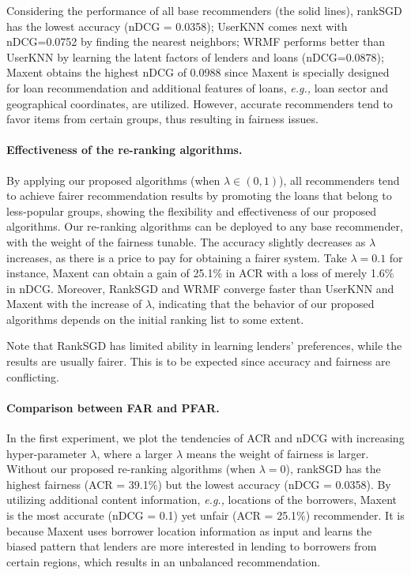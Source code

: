 Considering the performance of all base recommenders (the solid lines), rankSGD has the lowest accuracy (nDCG = 0.0358); UserKNN comes next with nDCG=0.0752 by finding the nearest neighbors; WRMF performs better than UserKNN by learning the latent factors of lenders and loans (nDCG=0.0878); Maxent obtains the highest nDCG of 0.0988 since Maxent is specially designed for loan recommendation and additional features of loans, \emph{e.g.,} loan sector and geographical coordinates, are utilized. However, accurate recommenders tend to favor items from certain groups, thus resulting in fairness issues.

\paragraph{Effectiveness of the re-ranking algorithms.} By applying our proposed algorithms (when $\lambda\in(0,1)$), all recommenders tend to achieve fairer recommendation results by promoting the loans that belong to less-popular groups, showing the flexibility and effectiveness of our proposed algorithms. Our re-ranking algorithms can be deployed to any base recommender, with the weight of the fairness tunable. The accuracy slightly decreases as $\lambda$ increases, as there is a price to pay for obtaining a fairer system. Take $\lambda=0.1$ for instance, Maxent can obtain a gain of 25.1\% in ACR with a loss of merely 1.6\% in nDCG. Moreover, RankSGD and WRMF converge faster than UserKNN and Maxent with the increase of $\lambda$, indicating that the behavior of our proposed algorithms depends on the initial ranking list to some extent. 

Note that RankSGD has limited ability in learning lenders' preferences, while the results are usually fairer. This is to be expected since accuracy and fairness are conflicting.

\paragraph{Comparison between FAR and PFAR.} 


In the first experiment, we plot the tendencies of ACR and nDCG with increasing hyper-parameter $\lambda$, where a larger $\lambda$ means the weight of fairness is larger. Without our proposed re-ranking algorithms (when $\lambda=0$), rankSGD has the highest fairness (ACR = 39.1\%) but the lowest accuracy (nDCG = 0.0358). By utilizing additional content information, \emph{e.g.,} locations of the borrowers, Maxent is the most accurate (nDCG = 0.1) yet unfair (ACR = 25.1\%) recommender. It is because Maxent uses borrower location information as input and learns the biased pattern that lenders are more interested in lending to borrowers from certain regions, which results in an unbalanced recommendation.

